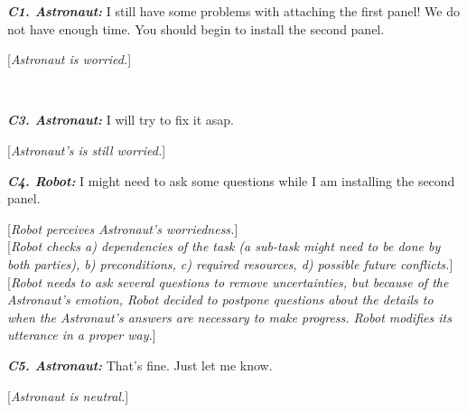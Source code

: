 \begin{spacing}{1.2}
\small{
\begin{description}
  \item \textit{\textbf{C1. Astronaut:}} I still have some problems with
  attaching the first panel! We do not have enough time. You should begin to
  install the second panel.

  [\textit{Astronaut is worried.}]\\

  \item {}\\
  
  \item \textit{\textbf{C3. Astronaut:}} I will try to fix it asap.

  [\textit{Astronaut's is still worried.}]\\
  
  \item \textit{\textbf{C4. Robot:}} I might need to ask some questions while I
  am installing the second panel.

  [\textit{Robot perceives Astronaut's worriedness.}]\\

  [\textit{Robot checks a) dependencies of the task (a sub-task might need to be
  done by both parties), b) preconditions, c) required resources, d) possible
  future conflicts.}]\\
  
  [\textit{Robot needs to ask several questions to remove uncertainties, but
  because of the Astronaut's emotion, Robot decided to postpone questions about
  the details to when the Astronaut's answers are necessary to make progress.
  Robot modifies its utterance in a proper way.}]\\
  
  \item \textit{\textbf{C5. Astronaut:}} That's fine. Just let me know.
  
  [\textit{Astronaut is neutral.}]
  
\end{description}
}
\end{spacing}

